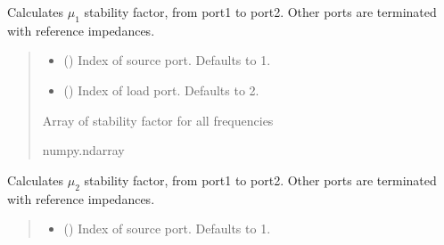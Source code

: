 \documentclass[letterpaper,10pt,english]{sphinxmanual}
\begin{document}
\begin{fulllineitems}
\begin{fulllineitems}
\label{\detokenize{touchstone:touchstone.spfile.stability_factor_mu1}}
\pysigstartsignatures
{}
\pysigstopsignatures
\sphinxAtStartPar
Calculates \(\mu_1\) stability factor, from port1 to port2. Other ports are terminated with reference impedances.
\begin{quote}\begin{description}
\begin{itemize}
\item {}
\sphinxAtStartPar
{} (\sphinxstyleliteralemphasis{\sphinxupquote{, }}) \textendash{} Index of source port. Defaults to 1.

\item {}
\sphinxAtStartPar
{} (\sphinxstyleliteralemphasis{\sphinxupquote{, }}) \textendash{} Index of load port. Defaults to 2.

\end{itemize}

\sphinxAtStartPar
Array of stability factor for all frequencies

\sphinxAtStartPar
numpy.ndarray

\end{description}\end{quote}

\end{fulllineitems}


\begin{fulllineitems}
\label{\detokenize{touchstone:touchstone.spfile.stability_factor_mu2}}
\pysigstartsignatures
{}
\pysigstopsignatures
\sphinxAtStartPar
Calculates \(\mu_2\) stability factor, from port1 to port2. Other ports are terminated with reference impedances.
\begin{quote}\begin{description}
\begin{itemize}
\item {}
\sphinxAtStartPar
{} (\sphinxstyleliteralemphasis{\sphinxupquote{, }}) \textendash{} Index of source port. Defaults to 1.


\end{itemize}
\end{description}
\end{quote}
\end{fulllineitems}
\end{fulllineitems}
\end{document}
